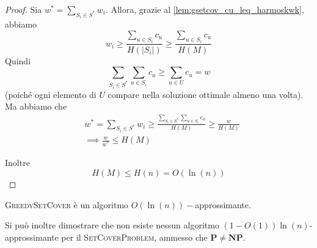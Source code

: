 \begin{proof}
	Sia $w^* = \sum_{S_i \in S^*} w_i$.
	Allora, grazie al \cref{lem:gsetcov_cu_leq_harmoskwk}, abbiamo
	$$
		w_i \geq \frac{\sum_{u \in S_i} c_u}{H(|S_i|)} \geq \frac{\sum_{u \in S_i} c_u}{H(M)}
	$$
	Quindi
	$$
		\sum_{S_i \in S^*}\sum_{u \in S_i} c_u \geq \sum_{u \in U} c_u = w
	$$
	(poiché ogni elemento di $U$ compare nella soluzione ottimale almeno una volta).
	Ma abbiamo che
	\begin{align}
		 & w^* = \sum_{S_i \in S^*} w_i \geq \frac{\sum_{S_i \in S^*} \sum_{u \in S_i} c_u}{H(M)} \geq \frac{w}{H(M)} \\
		 & \implies \frac{w}{w^*} \leq H(M)
	\end{align}

	Inoltre
	$$
		H(M) \leq H(n) = O(\ln(n))
	$$
\end{proof}
\begin{corollario}
	\textsc{GreedySetCover} è un algoritmo $O(\ln(n))-$approssimante.
\end{corollario}
Si può inoltre dimostrare che non esiste nessun algoritmo
$(1 - O(1))\ln(n)$-approssimante per il \textsc{SetCoverProblem},
ammesso che $\mathbf{P} \neq \mathbf{NP}$.

